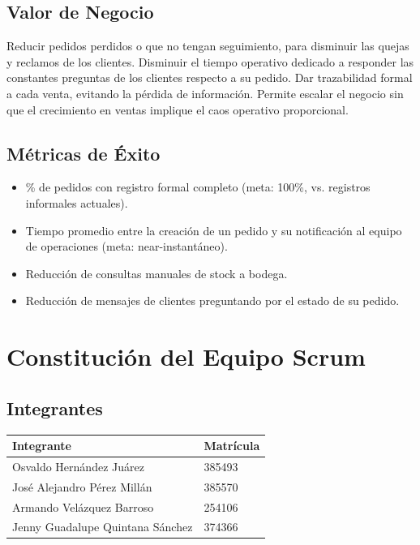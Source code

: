 \documentclass[12pt, a4paper]{article}
\begin{document}
\subsection{Valor de Negocio}
Reducir pedidos perdidos o que no tengan seguimiento, para disminuir las quejas y reclamos de los clientes. Disminuir el tiempo operativo dedicado a responder las constantes preguntas de los clientes respecto a su pedido. Dar trazabilidad formal a cada venta, evitando la pérdida de información. Permite escalar el negocio sin que el crecimiento en ventas implique el caos operativo proporcional.

\subsection{Métricas de Éxito}
\begin{itemize}[leftmargin=*]
    \item \% de pedidos con registro formal completo (meta: 100\%, vs. registros informales actuales).
    \item Tiempo promedio entre la creación de un pedido y su notificación al equipo de operaciones (meta: near-instantáneo).
    \item Reducción de consultas manuales de stock a bodega.
    \item Reducción de mensajes de clientes preguntando por el estado de su pedido.
\end{itemize}


\section{Constitución del Equipo Scrum}

\subsection{Integrantes}
\begin{center}
\begin{tabular}{ll}
\toprule
\textbf{Integrante} & \textbf{Matrícula} \\
\midrule
Osvaldo Hernández Juárez & 385493 \\
José Alejandro Pérez Millán & 385570 \\
Armando Velázquez Barroso & 254106 \\
Jenny Guadalupe Quintana Sánchez & 374366 \\
\bottomrule
\end{tabular}
\end{center}
\end{document}
